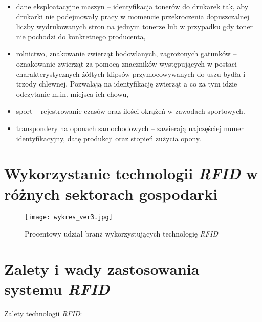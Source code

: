 \begin{itemize}
	\item dane eksploatacyjne maszyn – identyfikacja tonerów do drukarek tak, aby drukarki nie podejmowały pracy w momencie przekroczenia dopuszczalnej liczby wydrukowanych stron na jednym tonerze lub w przypadku gdy toner nie pochodzi do konkretnego producenta, 
	
	\item rolnictwo, znakowanie zwierząt hodowlanych, zagrożonych gatunków – oznakowanie zwierząt za pomocą znaczników występujących w postaci charakterystycznych żółtych klipsów przymocowywanych do uszu bydła i trzody chlewnej. Pozwalają na identyfikację zwierząt a co za tym idzie odczytanie m.in. miejsca ich chowu,
	
	\item sport – rejestrowanie czasów oraz ilości okrążeń w zawodach sportowych. 
	
	\item transpondery na oponach samochodowych – zawierają najczęściej numer identyfikacyjny, datę produkcji oraz stopień zużycia opony.

\end{itemize}


\section{Wykorzystanie technologii \emph{RFID} w różnych sektorach gospodarki}

	\begin{figure}[h!]
	\centering
	    \texttt{[image: wykres\_ver3.jpg]}
	    \caption{Procentowy udział branż wykorzystujących technologię \emph{RFID}}
	\end{figure}


\section {Zalety i wady zastosowania systemu \emph{RFID}}

\noindent 
Zalety technologii \emph{RFID}:

